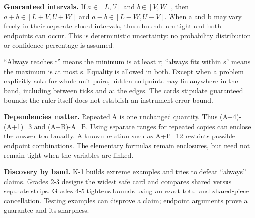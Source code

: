 \textbf{Guaranteed intervals.} If $a\in[L,U]$ and $b\in[V,W]$, then $a+b\in[L+V,U+W]$ and $a-b\in[L-W,U-V]$. When a and b may vary freely in their separate closed intervals, these bounds are tight and both endpoints can occur. This is deterministic uncertainty: no probability distribution or confidence percentage is assumed.

``Always reaches r'' means the minimum is at least r; ``always fits within s'' means the maximum is at most s. Equality is allowed in both. Except when a problem explicitly asks for whole-unit pairs, hidden endpoints may lie anywhere in the band, including between ticks and at the edges. The cards stipulate guaranteed bounds; the ruler itself does not establish an instrument error bound.

\textbf{Dependencies matter.} Repeated A is one unchanged quantity. Thus (A+4)-(A+1)=3 and (A+B)-A=B. Using separate ranges for repeated copies can enclose the answer too broadly. A known relation such as A+B=12 restricts possible endpoint combinations. The elementary formulas remain enclosures, but need not remain tight when the variables are linked.

\textbf{Discovery by band.} K-1 builds extreme examples and tries to defeat ``always'' claims. Grades 2-3 designs the widest safe card and compares shared versus separate strips. Grades 4-5 tightens bounds using an exact total and shared-piece cancellation. Testing examples can disprove a claim; endpoint arguments prove a guarantee and its sharpness.
